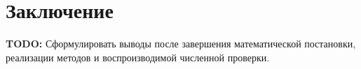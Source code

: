 \section{Заключение}
\label{sec:conclusions}

\textbf{TODO:} Сформулировать выводы после завершения математической
постановки, реализации методов и воспроизводимой численной проверки.
